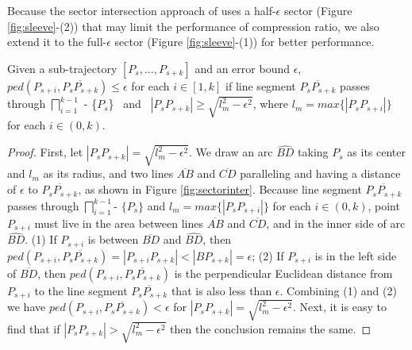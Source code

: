 Because the sector intersection approach of \cite{Williams:Longest, Sklansky:Cone,Zhao:Sleeve} uses a half-$\epsilon$ sector (Figure \ref{fig:sleeve}-(2)) that may limit the performance of compression ratio, we also extend it to the full-$\epsilon$ sector (Figure \ref{fig:sleeve}-(1)) for better performance.

\begin{proposition}
	\label{theo-full-sector}
	Given a sub-trajectory $[P_s,...,P_{s+k}]$ and an error bound $\epsilon$, $ped(P_{s+i}, \overline{P_sP_{s+k}})\le \epsilon$ for each $i \in [1,k]$ if line segment $\overline{P_sP_{s+k}}$ passes through $\bigsqcap_{i=1}^{k-1}$ - \{$P_s$\} ~and~ $|P_sP_{s+k}| \ge \sqrt{l_{m}^2 - \epsilon^2}$, where $l_{m} = max\{|P_sP_{s+i}|\}$ for each $i \in (0, k)$.
\end{proposition}

\begin{proof}
First, let $|P_sP_{s+k}| = \sqrt{l_m^2 - \epsilon^2}$. We draw an arc $\widehat{BD}$ taking $P_s$ as its center and $l_m$ as its radius, and two lines $\overline{AB}$ and $\overline{CD}$ paralleling and having a distance of $\epsilon$ to $\overline{P_sP_{s+k}}$, as shown in Figure \ref{fig:sectorinter}.
Because line segment $\overline{P_sP_{s+k}}$ passes through $\bigsqcap_{i=1}^{k-1}$- $\{P_s\}$ and $l_{m} = max\{|P_sP_{s+i}|\}$ for each $i \in (0, k)$, point $P_{s+i}$ must live in the area between lines $\overline{AB}$ and $\overline{CD}$, and in the inner side of arc $\widehat{BD}$.
(1) If $P_{s+i}$ is between $\overline{BD}$ and $\widehat{BD}$, then $ped(P_{s+i}, \overline{P_sP_{s+k}}) = |{P_{s+i}P_{s+k}}| < |{BP_{s+k}}| = \epsilon$; 
(2) If $P_{s+i}$ is in the left side of $\overline{BD}$, then  $ped(P_{s+i}, \overline{P_sP_{s+k}})$ is the perpendicular Euclidean distance from $P_{s+i}$ to the line segment $\overline{P_sP_{s+k}}$ that is also less than $\epsilon$. Combining (1) and (2) we have $ped(P_{s+i}, \overline{P_sP_{s+k}})< \epsilon$ for $|P_sP_{s+k}| = \sqrt{l_m^2 - \epsilon^2}$.
Next, it is easy to find that if $|P_sP_{s+k}| > \sqrt{l_m^2 - \epsilon^2}$ then the conclusion remains the same.
\end{proof}

